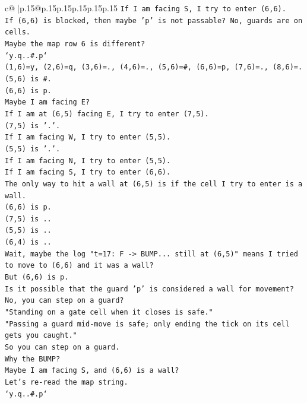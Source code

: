 \documentclass{article}
\begin{document}
{\begin{supertabular}{c@{$\;$}|p{.15\linewidth}@{}p{.15\linewidth}p{.15\linewidth}p{.15\linewidth}p{.15\linewidth}p{.15\linewidth}}
{{{\texttt{If I am facing S, I try to enter (6,6).} \\
\texttt{If (6,6) is blocked, then maybe 'p' is not passable? No, guards are on cells.} \\
\texttt{Maybe the map row 6 is different?} \\
\texttt{`y.q..\#.p`} \\
\texttt{(1,6)=y, (2,6)=q, (3,6)=., (4,6)=., (5,6)=\#, (6,6)=p, (7,6)=., (8,6)=.} \\
\texttt{(5,6) is \#.} \\
\texttt{(6,6) is p.} \\
\texttt{Maybe I am facing E?} \\
\texttt{If I am at (6,5) facing E, I try to enter (7,5).} \\
\texttt{(7,5) is '.'.} \\
\texttt{If I am facing W, I try to enter (5,5).} \\
\texttt{(5,5) is '.'.} \\
\texttt{If I am facing N, I try to enter (5,5).} \\
\texttt{If I am facing S, I try to enter (6,6).} \\
\texttt{The only way to hit a wall at (6,5) is if the cell I try to enter is a wall.} \\
\texttt{(6,6) is p.} \\
\texttt{(7,5) is ..} \\
\texttt{(5,5) is ..} \\
\texttt{(6,4) is ..} \\
\texttt{Wait, maybe the log "t=17: F {-}> BUMP... still at (6,5)" means I tried to move to (6,6) and it was a wall?} \\
\texttt{But (6,6) is p.} \\
\texttt{Is it possible that the guard 'p' is considered a wall for movement? No, you can step on a guard?} \\
\texttt{"Standing on a gate cell when it closes is safe."} \\
\texttt{"Passing a guard mid{-}move is safe; only ending the tick on its cell gets you caught."} \\
\texttt{So you can step on a guard.} \\
\texttt{Why the BUMP?} \\
\texttt{Maybe I am facing S, and (6,6) is a wall?} \\
\texttt{Let's re{-}read the map string.} \\
\texttt{`y.q..\#.p`} \\
}}}
\end{supertabular}}
\end{document}
